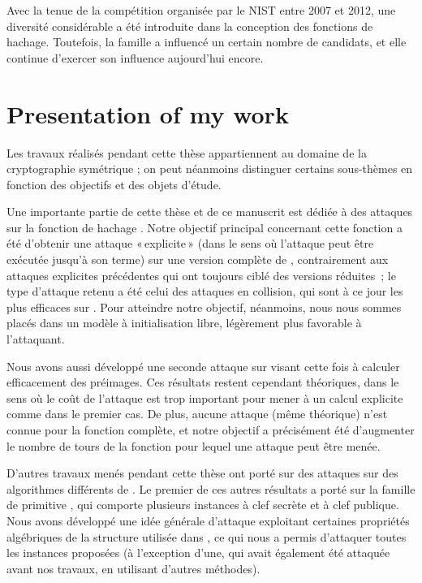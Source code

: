 Avec la tenue de la compétition \shathree organisée par le NIST entre 2007 et 2012, une diversité considérable a été introduite dans la conception des fonctions de hachage.
Toutefois, la famille \mdsha a influencé un certain nombre de candidats, et elle continue d'exercer son influence aujourd'hui encore.

\chapter[Présentation de mes travaux]{Presentation of my work}

Les travaux réalisés pendant cette thèse appartiennent au domaine de la cryptographie symétrique ; on peut néanmoins distinguer certains sous-thèmes en fonction des objectifs et des objets d'étude.

\medskip

Une importante partie de cette thèse et de ce manuscrit est dédiée à des attaques sur la fonction de hachage \shaone. Notre objectif principal concernant cette fonction a été d'obtenir
une attaque «\,explicite\,» (dans le sens où l'attaque peut être exécutée jusqu'à son terme) sur une version complète de \shaone,
contrairement aux attaques explicites précédentes
qui ont toujours ciblé des versions réduites~; le type d'attaque retenu a été celui des attaques en collision, qui sont à ce jour les plus efficaces sur \shaone.
Pour atteindre notre objectif, néanmoins, nous nous sommes placés dans un modèle à initialisation libre, légèrement plus favorable à l'attaquant.

Nous avons aussi développé une seconde attaque sur \shaone visant cette fois à calculer efficacement des préimages. Ces résultats restent cependant théoriques, dans le sens où le coût
de l'attaque est trop important pour mener à un calcul explicite comme dans le premier cas. De plus, aucune attaque (même théorique) n'est connue pour la fonction complète, et notre
objectif a précisément été d'augmenter le nombre de tours de la fonction pour lequel une attaque peut être menée.

\medskip

D'autres travaux menés pendant cette thèse ont porté sur des attaques sur des algorithmes différents de \shaone. Le premier de ces autres résultats a porté sur la famille de primitive
\asasa, qui comporte plusieurs instances à clef secrète et à clef publique. Nous avons développé une idée générale d'attaque exploitant certaines propriétés algébriques de la
structure utilisée dans \asasa, ce qui nous a permis d'attaquer toutes les instances proposées (à l'exception d'une, qui avait également été attaquée avant nos travaux, en utilisant
d'autres méthodes).

